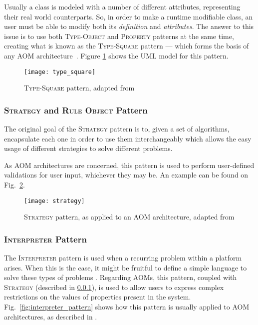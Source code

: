 Usually a class is modeled with a number of different attributes, representing their real world counterparts. So, in order to make a runtime modifiable class, an user must be able to modify both its \emph{definition} and \emph{attributes}. The answer to this issue is to use both \textsc{Type-Object} and \textsc{Property} patterns at the same time, creating what is known as the \textsc{Type-Square} pattern --- which forms the basis of any AOM architecture~\cite{YJ02}. Figure \ref{fig:type_square} shows the UML model for this pattern.

\begin{figure}[H]
  \centering
  \texttt{[image: type\_square]}
  \caption{\textsc{Type-Square} pattern, adapted from \cite{YBJ01}}
  \label{fig:type_square}
\end{figure}

\subsubsection{\textsc{Strategy} and \textsc{Rule Object} Pattern}\label{sec:strategy_pattern}

The original goal of the \textsc{Strategy} pattern is to, given a set of algorithms, encapsulate each one in order to use them interchangeably which allows the easy usage of different strategies to solve different problems\cite{gang_of_four}.

As AOM architectures are concerned, this pattern is used to perform user-defined validations for user input, whichever they may be. An example can be found on Fig.~\ref{fig:strategy_pattern}.

\begin{figure}[H]
  \centering
  \texttt{[image: strategy]}
  \caption{\textsc{Strategy} pattern, as applied to an AOM architecture, adapted from \cite{gang_of_four}}
  \label{fig:strategy_pattern}
\end{figure}

\subsubsection{\textsc{Interpreter} Pattern}\label{sec:interpreter_pattern}

The \textsc{Interpreter} pattern is used when a recurring problem within a platform arises. When this is the case, it might be fruitful to define a simple language to solve these types of problems \cite{gang_of_four}. Regarding AOMs, this pattern, coupled with \textsc{Strategy} (described in \ref{sec:strategy_pattern}), is used to allow users to express complex restrictions on the values of properties present in the system. Fig.~\ref{fig:interpreter_pattern} shows how this pattern is usually applied to AOM architectures, as described in \cite{phd_hugo_ferreira}.


